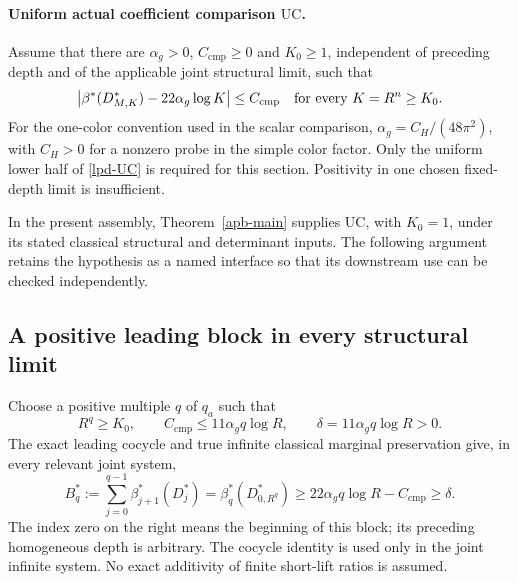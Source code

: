 \paragraph{Uniform actual coefficient comparison \(\mathrm{UC}\).}
Assume that there are \(\alpha_g>0\), \(C_{\mathrm{cmp}}\ge0\)
and \(K_0\ge1\), independent of preceding depth and of the applicable
joint structural limit, such that
\begin{equation}
 \left|\beta^{*}(D_{M,K}^{*})
                  -22\alpha_g\log K\right|
       \le C_{\mathrm{cmp}}
 \quad\hbox{for every }K=R^n\ge K_0.
 \label{lpd-UC}
\end{equation}
For the one-color convention used in the scalar comparison,
\(\alpha_g=C_H/(48\pi^2)\), with \(C_H>0\) for a nonzero probe
in the simple color factor. Only the uniform lower half of
\eqref{lpd-UC} is required for this section. Positivity in one
chosen fixed-depth limit is insufficient.

In the present assembly, Theorem~\ref{apb-main} supplies
\(\mathrm{UC}\), with \(K_0=1\), under its stated classical structural
and determinant inputs. The following argument retains the hypothesis
as a named interface so that its downstream use can be checked
independently.

\subsection{A positive leading block in every structural limit}
\label{lpd-leading-block}

Choose a positive multiple \(q\) of \(q_a\) such that
\begin{equation}
 R^q\ge K_0,\qquad
 C_{\mathrm{cmp}}\le 11\alpha_g q\log R,
 \qquad
 \delta=11\alpha_g q\log R>0.
 \label{lpd-q-choice}
\end{equation}
The exact leading cocycle and true infinite classical marginal
preservation give, in every relevant joint system,
\begin{equation}
 B_q^{*}:=\sum_{j=0}^{q-1}\beta_{j+1}^{*}(D_j^{*})
       =\beta_q^{*}(D_{0,R^q}^{*})
       \ge 22\alpha_g q\log R-C_{\mathrm{cmp}}
       \ge\delta.
 \label{lpd-infinite-block}
\end{equation}
The index zero on the right means the beginning of this block;
its preceding homogeneous depth is arbitrary. The cocycle identity
is used only in the joint infinite system. No exact additivity
of finite short-lift ratios is assumed.

